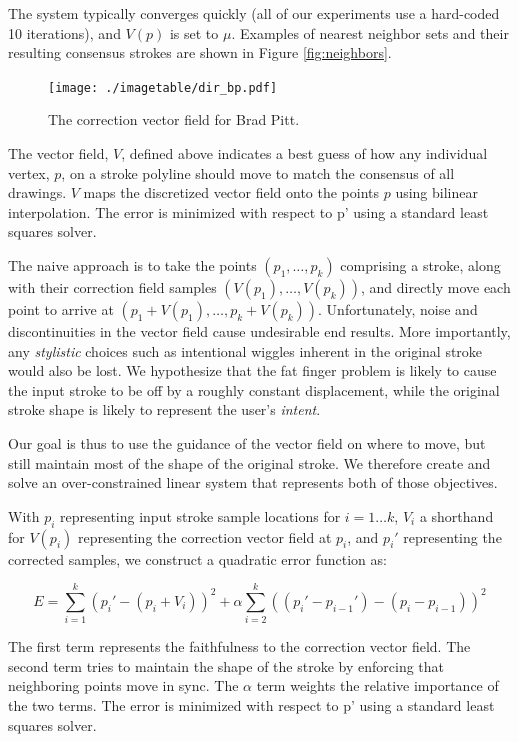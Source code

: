 The system typically converges quickly (all of our experiments use a hard-coded 10 iterations), and $V(p)$ is set to $\mu$.  Examples of nearest neighbor sets and their resulting consensus strokes are shown in Figure \ref{fig:neighbors}.



\begin{figure}
  \centering%
\texttt{[image: ./imagetable/dir\_bp.pdf]}
  \caption{The correction vector field for Brad Pitt.}
  \label{fig:daf-zoom-flow}
\end{figure}



The vector field, $V$, defined above indicates a best guess of how any individual vertex, $p$, on a stroke polyline should move to match the consensus of all drawings. $V$ maps the discretized vector field onto the points $p$ using bilinear interpolation. The error is minimized with respect to p' using a standard least squares solver.

The naive approach is to take the points $(p_1, \ldots, p_k)$ comprising a stroke, along with their correction field samples $(V(p_1), \ldots, V(p_k))$, and directly move each point to arrive at $(p_1 + V(p_1), \ldots, p_k + V(p_k))$.  Unfortunately, noise and discontinuities in the vector field cause undesirable end results. More importantly, any {\em stylistic} choices such as intentional wiggles inherent in the original stroke would also be lost.  We hypothesize that the fat finger problem is likely to cause the input stroke to be off by a roughly constant displacement, while the original stroke shape is likely to represent the user's {\em intent}.

Our goal is thus to use the guidance of the vector field on where to move, but still maintain most of the shape of the original stroke.  We therefore create and solve an over-constrained linear system that represents both of those objectives.

With $p_i$ representing input stroke sample locations for $i=1\ldots k$, $V_i$ a shorthand for $V(p_i)$ representing the correction vector field at $p_i$, and $p_i'$ representing the corrected samples, we construct a quadratic error function as:

\begin{equation}
E =  \sum_{i=1}^k (p_i' - (p_i + V_i))^2 +  \alpha \sum_{i=2}^k ((p_i' - p_{i-1}') - (p_i - p_{i-1}))^2
\end{equation}

The first term represents the faithfulness to the correction vector field. The second term tries to maintain the shape of the stroke by enforcing that neighboring points move in sync. The $\alpha$ term weights the relative importance of the two terms. The error is minimized with respect to p' using a standard least squares solver.



